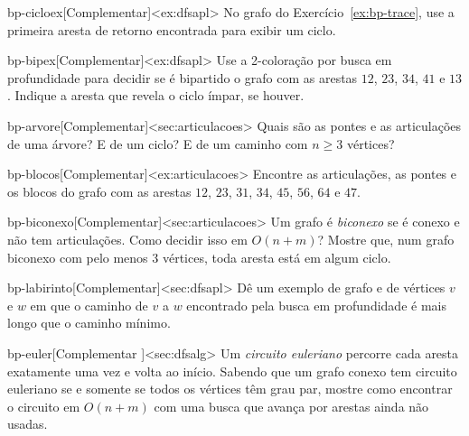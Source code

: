 \begin{exercicio}{bp-cicloex}[Complementar]<ex:dfsapl>
No grafo do Exercício~\ref{ex:bp-trace}, use a primeira aresta de retorno encontrada para exibir um ciclo.
\end{exercicio}
\begin{exercicio}{bp-bipex}[Complementar]<ex:dfsapl>
Use a 2-coloração por busca em profundidade para decidir se é bipartido o grafo com as arestas $12$, $23$, $34$, $41$ e $13$. Indique a aresta que revela o ciclo ímpar, se houver.
\end{exercicio}
\begin{exercicio}{bp-arvore}[Complementar]<sec:articulacoes>
Quais são as pontes e as articulações de uma árvore? E de um ciclo? E de um caminho com $n\ge3$ vértices?
\end{exercicio}
\begin{exercicio}{bp-blocos}[Complementar]<ex:articulacoes>
Encontre as articulações, as pontes e os blocos do grafo com as arestas $12$, $23$, $31$, $34$, $45$, $56$, $64$ e $47$.
\end{exercicio}
\begin{exercicio}{bp-biconexo}[Complementar]<sec:articulacoes>
Um grafo é \emph{biconexo} se é conexo e não tem articulações. Como decidir isso em $O(n+m)$? Mostre que, num grafo biconexo com pelo menos 3 vértices, toda aresta está em algum ciclo.
\end{exercicio}
\begin{exercicio}{bp-labirinto}[Complementar]<sec:dfsapl>
Dê um exemplo de grafo e de vértices $v$ e $w$ em que o caminho de $v$ a $w$ encontrado pela busca em profundidade é mais longo que o caminho mínimo.
\end{exercicio}
\begin{exercicio}{bp-euler}[Complementar \estrela]<sec:dfsalg>
Um \emph{circuito euleriano} percorre cada aresta exatamente uma vez e volta ao início. Sabendo que um grafo conexo tem circuito euleriano se e somente se todos os vértices têm grau par, mostre como encontrar o circuito em $O(n+m)$ com uma busca que avança por arestas ainda não usadas.
\end{exercicio}
